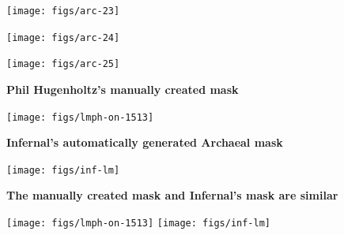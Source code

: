 \documentclass[landscape]{slides}
\begin{document}
\begin{slide}\begin{center}\texttt{[image: figs/arc-23]}\end{center}\vfill\end{slide}
\begin{slide}\begin{center}\texttt{[image: figs/arc-24]}\end{center}\vfill\end{slide}
\begin{slide}\begin{center}\texttt{[image: figs/arc-25]}\end{center}\vfill\end{slide}
\begin{slide}
\begin{center}
\textbf{Phil Hugenholtz's manually created mask}
\end{center}
\small

\begin{center}
\texttt{[image: figs/lmph-on-1513]}

\end{center}
\vfill
\end{slide}
\begin{slide}
\begin{center}
\textbf{Infernal's automatically generated Archaeal mask}
\end{center}
\small

\begin{center}
\texttt{[image: figs/inf-lm]}

\end{center}
\vfill
\end{slide}
\begin{slide}
\begin{center}
\textbf{The manually created mask and Infernal's mask are similar}
\end{center}
\small

\begin{center}
\texttt{[image: figs/lmph-on-1513]}
\texttt{[image: figs/inf-lm]}

\end{center}
\vfill
\end{slide}
\end{document}
